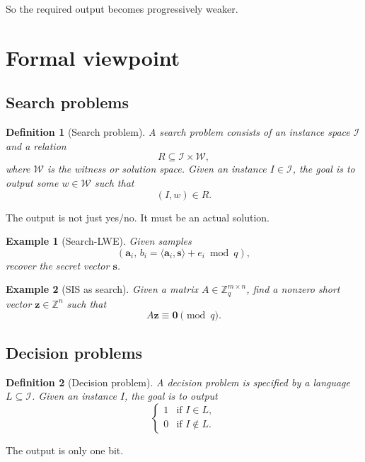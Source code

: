 \documentclass[11pt]{article}
\newtheorem{definition}{Definition}
\newtheorem{example}{Example}
\begin{document}
	So the required output becomes progressively weaker.
	
	\section{Formal viewpoint}
	
	\subsection{Search problems}
	
	\begin{definition}[Search problem]
		A search problem consists of an instance space $\mathcal{I}$ and a relation
		\[
		R \subseteq \mathcal{I} \times \mathcal{W},
		\]
		where $\mathcal{W}$ is the witness or solution space. Given an instance $I \in \mathcal{I}$, the goal is to output some $w \in \mathcal{W}$ such that
		\[
		(I,w)\in R.
		\]
	\end{definition}
	
	\noindent
	The output is not just yes/no. It must be an actual solution.
	
	\begin{example}[Search-LWE]
		Given samples
		\[
		(\bm a_i,\, b_i = \langle \bm a_i,\bm s\rangle + e_i \bmod q),
		\]
		recover the secret vector $\bm s$.
	\end{example}
	
	\begin{example}[SIS as search]
		Given a matrix $A \in \mathbb{Z}_q^{m\times n}$, find a nonzero short vector $\bm z \in \mathbb{Z}^n$ such that
		\[
		A\bm z \equiv \bm 0 \pmod q.
		\]
	\end{example}
	
	\subsection{Decision problems}
	
	\begin{definition}[Decision problem]
		A decision problem is specified by a language $L \subseteq \mathcal{I}$. Given an instance $I$, the goal is to output
		\[
		\begin{cases}
			1 & \text{if } I \in L,\\
			0 & \text{if } I \notin L.
		\end{cases}
		\]
	\end{definition}
	
	\noindent
	The output is only one bit.
	
\end{document}

